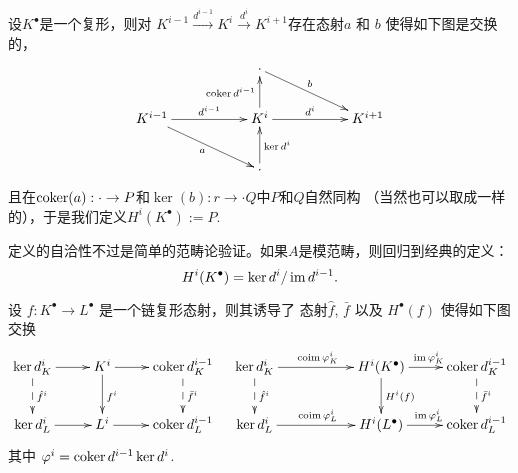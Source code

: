 


\begin{para}[上同调]
设$K^\bullet$是一个复形，则对
$K^{i-1}\xrightarrow{d^{i-1}}K^i\xrightarrow{d^i}K^{i+1}$存在态射$a$ 和 $b$
使得如下图是交换的，
\[
	\begin{xy}
		\xymatrix{
			&&\cdot \ar[rrd]^-{b}&&\\
			K^{i-1} \ar[rr]^-{d^{i-1}} \ar[rrd]_{a}&& K^i \ar[rr]^-{d^i}\ar[u]^-{\coker d^{i-1}}&&K^{i+1}\\
			&&\cdot \ar[u]_-{\ker d^i}&&
		}
	\end{xy}
\]
且在$\operatorname{coker}(a):\cdot\to P$和$\ker(b):r\to \cdot Q$中$P$和$Q$自然同构
（当然也可以取成一样的），于是我们定义$H^i(K^\bullet):=P$.
\end{para}

定义的自洽性不过是简单的范畴论验证。如果$A$是模范畴，则回归到经典的定义：
\[
	H^i(K^\bullet)=\ker d^i/\operatorname{im} d^{i-1}.
\]

\begin{pro}
	设 $f:K^\bullet \to L^\bullet$ 是一个链复形态射，则其诱导了
    态射$\hat f$, $\bar f$ 以及 $H^\bullet(f)$ 使得如下图交换
	\[
		\xymatrix{
			\ker d_K^i\ar[r]\ar@{-->}[d]^{\hat{f}^i}&K^i\ar[r]
			\ar[d]^{f^i}&\coker d^{i-1}_K\ar@{-->}[d]^{\bar{f}^i}
			\\
			\ker d_L^i\ar[r]&L^i\ar[r]&\coker d^{i-1}_L
		}
		\quad 
		\xymatrix{
			\ker d_K^i\ar[rr]^{\coim \varphi^i_K}\ar@{-->}[d]^{\hat{f}^i}&&H^i(K^\bullet)\ar[r]^{\im\varphi^i_K}
			\ar[d]^{H^i(f)}&\coker d^{i-1}_K\ar@{-->}[d]^{\bar{f}^i}\\
			\ker d_L^i\ar[rr]^{\coim \varphi^i_L}&&H^i(L^\bullet)\ar[r]^{\im\varphi^i_L}&\coker d^{i-1}_L
		}
	\]
	其中 $\varphi^i=\operatorname{coker} d^{i-1}\ker d^i$.
\end{pro}

